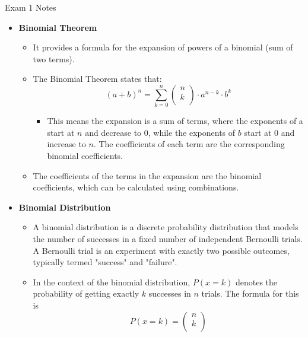 \begin{examnotes}{Exam 1 Notes}
\begin{itemize}
        \item \textbf{Binomial Theorem}
        \begin{itemize}
            \item It provides a formula for the expansion of powers of a binomial (sum of two terms).
            \item The Binomial Theorem states that:
            \begin{equation*}
                (a + b)^{n} = \sum_{k = 0}^{n} 
                \begin{pmatrix}
                    n \\
                    k \\
                \end{pmatrix}
                \cdot a^{n - k} \cdot b^{k}
            \end{equation*}
            \begin{itemize}
                \item This means the expansion is a sum of terms, where the exponents of a start at $n$ and decrease to 0, while the exponents of $b$ start at 0 and increase to $n$. The coefficients 
                of each term are the corresponding binomial coefficients.
            \end{itemize}
            \item The coefficients of the terms in the expansion are the binomial coefficients, which can be calculated using combinations.
        \end{itemize}
        \item \textbf{Binomial Distribution}
        \begin{itemize}
            \item A binomial distribution is a discrete probability distribution that models the number of successes in a fixed number of independent Bernoulli trials. A Bernoulli trial is an experiment 
            with exactly two possible outcomes, typically termed "success" and "failure".
            \item In the context of the binomial distribution, $P(x = k)$ denotes the probability of getting exactly $k$ successes in $n$ trials. The formula for this is
            \begin{equation*}
                P(x = k) = 
                \begin{pmatrix}
                    n \\
                    k \\
                \end{pmatrix}

\end{equation*}
\end{itemize}
\end{itemize}
\end{examnotes}
